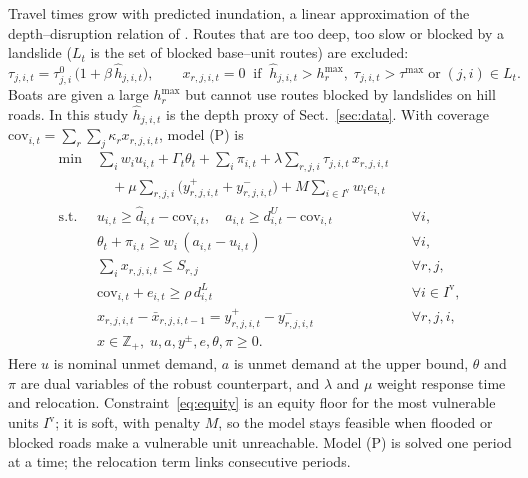 \documentclass[pdflatex,sn-basic]{sn-jnl}
\theoremstyle{plain}%
\theoremstyle{remark}%
\theoremstyle{definition}%
\begin{document}
Travel times grow with predicted inundation, a linear approximation of the depth--disruption relation of \citet{Pregnolato2017}. Routes that are too deep, too slow or blocked by a landslide ($L_t$ is the set of blocked base--unit routes) are excluded:
\begin{equation}
\tau_{j,i,t} = \tau^{0}_{j,i}\,\big(1 + \beta\, \hat h_{j,i,t}\big), \qquad
x_{r,j,i,t} = 0 \;\; \text{if} \;\; \hat h_{j,i,t} > h^{\max}_{r},\; \tau_{j,i,t} > \tau^{\max} \;\text{or}\; (j,i) \in L_t .
\label{eq:travel}
\end{equation}
Boats are given a large $h^{\max}_r$ but cannot use routes blocked by landslides on hill roads. In this study $\hat h_{j,i,t}$ is the depth proxy of Sect.~\ref{sec:data}. With coverage $\mathrm{cov}_{i,t} = \sum_{r}\sum_{j} \kappa_r x_{r,j,i,t}$, model (P) is
\begin{align}
\min \;& \sum_{i} w_i u_{i,t} + \Gamma_t\theta_t + \sum_{i}\pi_{i,t} + \lambda \sum_{r,j,i}\tau_{j,i,t}\,x_{r,j,i,t} \nonumber\\
&\quad + \mu \sum_{r,j,i}\big(y^{+}_{r,j,i,t} + y^{-}_{r,j,i,t}\big) + M \sum_{i \in I^{\mathrm{v}}} w_i e_{i,t} \label{eq:obj}\\
\text{s.t.}\;& u_{i,t} \ge \hat d_{i,t} - \mathrm{cov}_{i,t}, \quad a_{i,t} \ge d^{U}_{i,t} - \mathrm{cov}_{i,t} && \forall i, \label{eq:short}\\
& \theta_t + \pi_{i,t} \ge w_i\,(a_{i,t} - u_{i,t}) && \forall i, \label{eq:dual}\\
& \textstyle\sum_{i} x_{r,j,i,t} \le S_{r,j} && \forall r, j, \label{eq:supply}\\
& \mathrm{cov}_{i,t} + e_{i,t} \ge \rho\, d^{L}_{i,t} && \forall i \in I^{\mathrm{v}}, \label{eq:equity}\\
& x_{r,j,i,t} - \bar x_{r,j,i,t-1} = y^{+}_{r,j,i,t} - y^{-}_{r,j,i,t} && \forall r, j, i, \label{eq:reloc}\\
& x \in \mathbb{Z}_{+},\; u, a, y^{\pm}, e, \theta, \pi \ge 0. \nonumber
\end{align}
Here $u$ is nominal unmet demand, $a$ is unmet demand at the upper bound, $\theta$ and $\pi$ are dual variables of the robust counterpart, and $\lambda$ and $\mu$ weight response time and relocation. Constraint~\eqref{eq:equity} is an equity floor for the most vulnerable units $I^{\mathrm v}$; it is soft, with penalty $M$, so the model stays feasible when flooded or blocked roads make a vulnerable unit unreachable. Model (P) is solved one period at a time; the relocation term links consecutive periods.
\end{document}
